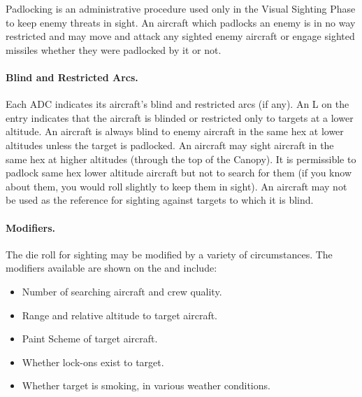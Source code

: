 Padlocking is an administrative procedure used only in the Visual Sighting Phase to keep enemy threats in sight. An aircraft which padlocks an enemy is in no way restricted and may move and attack any sighted enemy aircraft or engage sighted missiles whether they were padlocked by it or not. 

\paragraph{Blind and Restricted Arcs.} Each ADC indicates its aircraft's blind and restricted arcs (if any). An L on the entry indicates that the aircraft is blinded or restricted only to targets at a lower altitude. An aircraft is always blind to enemy aircraft in the same hex at lower altitudes unless the target is padlocked. An aircraft may sight aircraft in the same hex at higher altitudes (through the top of the Canopy). It is permissible to padlock same hex lower altitude aircraft but not to search for them (if you know about them, you would roll slightly to keep them in sight). An aircraft may not be used as the reference for sighting against targets to which it is blind.



\paragraph{Modifiers.} The die roll for sighting may be modified by a variety of circumstances. The modifiers available are shown on the  and include:

\begin{itemize}
    \item Number of searching aircraft and crew quality.
    \item Range and relative altitude to target aircraft.
    \item Paint Scheme of target aircraft.
    \item Whether lock-ons exist to target.
    \item Whether target is smoking,  in various weather conditions.
\end{itemize}


